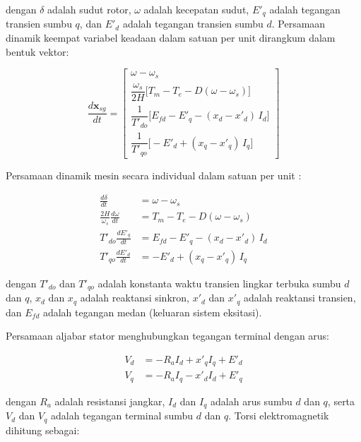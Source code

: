 dengan $\delta$ adalah sudut rotor, $\omega$ adalah kecepatan sudut, $E'_q$ adalah
tegangan transien sumbu $q$, dan $E'_d$ adalah tegangan transien sumbu $d$.
Persamaan dinamik keempat variabel keadaan dalam satuan per unit \cite{sauer2006power}
dirangkum dalam bentuk vektor:

\begin{equation}
  \frac{d\mathbf{x}_{sg}}{dt} =
  \begin{bmatrix}
    \omega - \omega_s \\[6pt]
    \dfrac{\omega_s}{2H}\bigl[T_m - T_e - D(\omega - \omega_s)\bigr] \\[8pt]
    \dfrac{1}{T'_{do}}\bigl[E_{fd} - E'_q - (x_d - x'_d)\,I_d\bigr] \\[8pt]
    \dfrac{1}{T'_{qo}}\bigl[-E'_d + (x_q - x'_q)\,I_q\bigr]
  \end{bmatrix}
  \label{eq:sg-vector}
\end{equation}

Persamaan dinamik mesin secara individual dalam satuan per unit \cite{sauer2006power}:

\begin{align}
  \frac{d\delta}{dt} &= \omega - \omega_s
  \label{eq:sg-delta} \\[4pt]
  \frac{2H}{\omega_s}\frac{d\omega}{dt} &= T_m - T_e - D(\omega - \omega_s)
  \label{eq:sg-omega} \\[4pt]
  T'_{do}\frac{dE'_q}{dt} &= E_{fd} - E'_q - (x_d - x'_d)\,I_d
  \label{eq:sg-Eq} \\[4pt]
  T'_{qo}\frac{dE'_d}{dt} &= -E'_d + (x_q - x'_q)\,I_q
  \label{eq:sg-Ed}
\end{align}

dengan $T'_{do}$ dan $T'_{qo}$ adalah konstanta waktu transien lingkar terbuka sumbu
$d$ dan $q$, $x_d$ dan $x_q$ adalah reaktansi sinkron, $x'_d$ dan $x'_q$ adalah
reaktansi transien, dan $E_{fd}$ adalah tegangan medan (keluaran sistem eksitasi).

Persamaan aljabar stator menghubungkan tegangan terminal dengan arus:

\begin{align}
  V_d &= -R_a I_d + x'_q I_q + E'_d
  \label{eq:sg-Vd} \\[4pt]
  V_q &= -R_a I_q - x'_d I_d + E'_q
  \label{eq:sg-Vq}
\end{align}

dengan $R_a$ adalah resistansi jangkar, $I_d$ dan $I_q$ adalah arus sumbu $d$ dan
$q$, serta $V_d$ dan $V_q$ adalah tegangan terminal sumbu $d$ dan $q$. Torsi
elektromagnetik dihitung sebagai:


